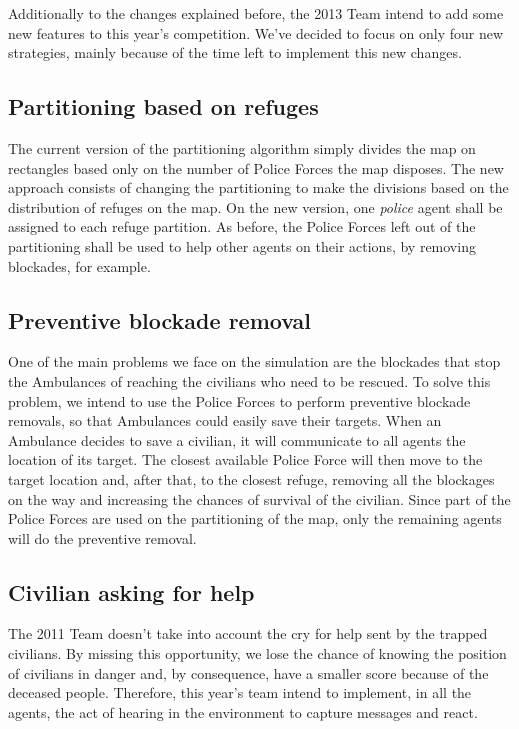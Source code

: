 Additionally to the changes explained before, the 2013 Team intend to add some new features to this year's competition. We've decided to focus on only four new strategies, mainly because of the time left to implement this new changes.


\subsection{Partitioning based on refuges}
	\label{subsec:partition}

The current version of the partitioning algorithm simply divides the map on rectangles based only on the number of Police Forces the map disposes. The new approach consists of changing the partitioning to make the divisions based on the distribution of refuges on the map. On the new version, one {\it police} agent shall be assigned to each refuge partition. As before, the Police Forces left out of the partitioning shall be used to help other agents on their actions, by removing blockades, for example.

\subsection{Preventive blockade removal}
	\label{subsec:preventive}

One of the main problems we face on the simulation are the blockades that stop the Ambulances of reaching the civilians who need to be rescued. To solve this problem, we intend to use the Police Forces to perform preventive blockade removals, so that Ambulances could easily save their targets. When an Ambulance decides to save a civilian, it will communicate to all agents the location of its target. The closest available Police Force will then move to the target location and, after that, to the closest refuge, removing all the blockages on the way and increasing the chances of survival of the civilian. Since part of the Police Forces are used on the partitioning of the map, only the remaining agents will do the preventive removal.

\subsection{Civilian asking for help}
	\label{subsec:help}
	
The 2011 Team doesn't take into account the cry for help sent by the trapped civilians. By missing this opportunity, we lose the chance of knowing the position of civilians in danger and, by consequence, have a smaller score because of the deceased people. Therefore, this year's team intend to implement, in all the agents, the act of hearing in the environment to capture messages and react.

